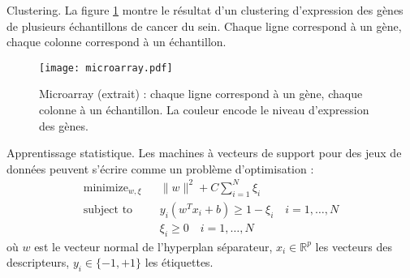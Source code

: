\documentclass[11pt,addpoints]{exam}
\begin{document}
\begin{questions}
\question[2] Clustering. La figure \ref{fig:micro_array} montre le
résultat d'un clustering d'expression des gènes de plusieurs échantillons de
cancer du sein. Chaque ligne correspond à un gène, chaque colonne
correspond à un échantillon.  
\begin{figure}[h!]
\centering
\texttt{[image: microarray.pdf]}
\caption{Microarray (extrait) : chaque ligne correspond à un gène,
  chaque colonne à un échantillon. La couleur encode le niveau
  d'expression des gènes.}
\label{fig:micro_array}
\end{figure}


\question[2] Apprentissage statistique.
Les machines à vecteurs de support pour des jeux de données
peuvent s'écrire comme un problème d'optimisation : 
\begin{eqnarray*}\label{equ:svm}
\mbox{minimize}_{w,\xi} & & \|w\|^2 + C \sum_{i=1}^{N}\xi_i\\
\mbox{subject to} & & y_i(w^Tx_i + b) \geq 1 - \xi_i \quad i = 1, \ldots, N \\
& & \xi_i \geq 0 \quad i = 1, \ldots, N
\end{eqnarray*}
où $w$ est le vecteur normal de l'hyperplan séparateur, $x_i \in
\mathbb{R}^p$ les vecteurs des descripteurs, $y_i \in \{-1, +1\}$ les
étiquettes. 

\end{questions}
\end{document}
